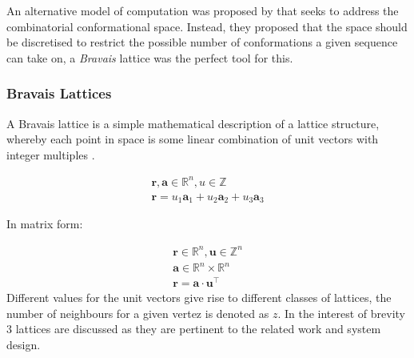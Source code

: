 An alternative model of computation was proposed by \cite{Yue} that seeks to
address the combinatorial conformational space. Instead, they proposed
that the space should be discretised to restrict the possible number of conformations
a given sequence can take on, a \emph{Bravais} lattice was the perfect tool for this.
\subsubsection{Bravais Lattices}
A Bravais lattice is a simple mathematical description of a lattice structure, whereby
each point in space is some linear combination of unit vectors with integer multiples \cite{kittel}. 

\begin{equation}
    \begin{gathered}
         \mathbf{r}, \mathbf{a} \in \mathbb{R}^n, u \in \mathbb{Z} \\
         \mathbf{r} = u_1\mathbf{a}_1 + u_2\mathbf{a}_2 + u_3\mathbf{a}_3 
    \end{gathered}
\end{equation}
    \begin{center}
        In matrix form:
    \end{center}
\begin{equation}
    \begin{gathered}
         \mathbf{r} \in \mathbb{R}^n, \mathbf{u} \in \mathbb{Z}^n \\
         \mathbf{a} \in \mathbb{R}^n \times \mathbb{R}^n \\
         \mathbf{r} = \mathbf{a} \cdot \mathbf{u}^\top
    \end{gathered}
\end{equation}
Different values for the unit vectors give rise to different classes of lattices, the number
of neighbours for a given vertez is denoted as $z$.
In the interest of brevity 3 lattices are discussed as they are pertinent 
to the related work and system design. \\
